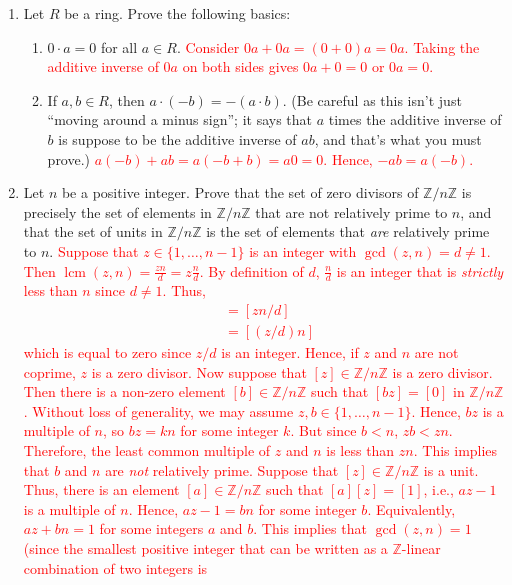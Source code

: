 \documentclass[12pt]{article}
\newcommand{\bbZ}{\mathbb{Z}}
\newcommand{\solution}[1]{\textcolor{red}{#1}}
\begin{document}
\pagestyle{fancy}


\begin{enumerate}
\item Let $R$ be a ring. Prove the following basics:
  \begin{enumerate}
  \item $0\cdot a=0$ for all $a\in R$. 
\solution{Consider $0a+0a=(0+0)a=0a$. Taking the additive inverse of
  $0a$ on both sides gives $0a+0=0$ or $0a=0$. }
  \item If $a,b\in R$, then $a\cdot (-b)=-(a\cdot b)$. (Be careful as this isn't just
    ``moving around a minus sign''; it says that $a$ times the
    additive inverse of $b$ is suppose to be the additive inverse of
    $ab$, and that's what you must prove.)
\solution{$a(-b)+ab = a(-b+b)=a0=0$. Hence, $-ab=a(-b)$. }
  \end{enumerate}
\item  Let $n$ be a positive integer. Prove that the set of zero
  divisors of $\bbZ/n\bbZ$ is precisely the set of elements in
  $\bbZ/n\bbZ$ that are not relatively prime to $n$, and that the set of
  units in $\bbZ/n\bbZ$ is the set of elements that \emph{are}
  relatively prime to $n$.
\solution{
Suppose that $z\in \{1,\dotsc, n-1\}$ is an integer with
$\gcd(z,n)=d\neq 1$. Then $\operatorname{lcm}(z,n)=\frac{zn}{d}=z
\frac{n}{d}$. By definition of $d$, $\frac{n}{d}$ is an integer that
is \emph{strictly} less than $n$ since $d\neq 1$. Thus,
\begin{align*}
  [z][n/d] &= [zn/d]\\
  &= [(z/d) n]
\end{align*}
which is equal to zero since $z/d$ is an integer. Hence, if $z$ and
$n$ are not coprime, $z$ is a zero divisor. 
Now suppose that $[z]\in \bbZ/n\bbZ$ is a zero divisor. Then there is a
non-zero element $[b]\in \bbZ/n\bbZ$ such that $[bz]=[0]$ in
$\bbZ/n\bbZ$. Without loss of generality, we may assume $z,b\in
\{1,\dotsc, n-1\}$. Hence, $bz$ is a multiple of $n$, so $bz=kn$ for
some integer $k$. But since $b<n$, $zb<zn$. Therefore, the least
common multiple of $z$ and $n$ is less than $zn$. This implies that
$b$ and $n$ are \emph{not} relatively prime.  }
\solution{Suppose that $[z]\in \bbZ/n\bbZ$ is a unit. Thus, there
  is an element $[a]\in \bbZ/n\bbZ$ such that $[a][z]=[1]$, i.e.,
  $az-1$ is a multiple of $n$. Hence, $az-1=bn$ for some integer
  $b$. Equivalently, $az+bn=1$ for some integers $a$ and $b$. This
  implies that $\gcd(z,n)=1$ (since the smallest positive integer that
  can be written as a $\bbZ$-linear combination of two integers is
}
\end{enumerate}
\end{document}
